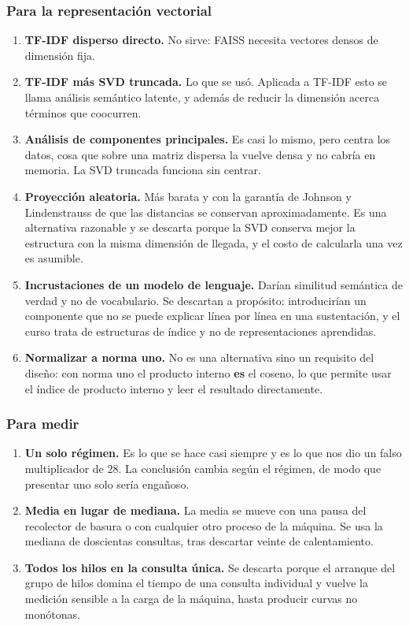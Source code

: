 \documentclass[11pt]{article}
\begin{document}
\subsubsection*{Para la representación vectorial}
\begin{enumerate}
  \item \textbf{TF-IDF disperso directo.} No sirve: FAISS necesita vectores densos de dimensión fija.
  \item \textbf{TF-IDF más SVD truncada.} Lo que se usó. Aplicada a TF-IDF esto se llama análisis semántico latente, y además de reducir la dimensión acerca términos que coocurren.
  \item \textbf{Análisis de componentes principales.} Es casi lo mismo, pero centra los datos, cosa que sobre una matriz dispersa la vuelve densa y no cabría en memoria. La SVD truncada funciona sin centrar.
  \item \textbf{Proyección aleatoria.} Más barata y con la garantía de Johnson y Lindenstrauss de que las distancias se conservan aproximadamente. Es una alternativa razonable y se descarta porque la SVD conserva mejor la estructura con la misma dimensión de llegada, y el costo de calcularla una vez es asumible.
  \item \textbf{Incrustaciones de un modelo de lenguaje.} Darían similitud semántica de verdad y no de vocabulario. Se descartan a propósito: introducirían un componente que no se puede explicar línea por línea en una sustentación, y el curso trata de estructuras de índice y no de representaciones aprendidas.
  \item \textbf{Normalizar a norma uno.} No es una alternativa sino un requisito del diseño: con norma uno el producto interno \textbf{es} el coseno, lo que permite usar el índice de producto interno y leer el resultado directamente.
\end{enumerate}
\subsubsection*{Para medir}
\begin{enumerate}
  \item \textbf{Un solo régimen.} Es lo que se hace casi siempre y es lo que nos dio un falso multiplicador de 28. La conclusión cambia según el régimen, de modo que presentar uno solo sería engañoso.
  \item \textbf{Media en lugar de mediana.} La media se mueve con una pausa del recolector de basura o con cualquier otro proceso de la máquina. Se usa la mediana de doscientas consultas, tras descartar veinte de calentamiento.
  \item \textbf{Todos los hilos en la consulta única.} Se descarta porque el arranque del grupo de hilos domina el tiempo de una consulta individual y vuelve la medición sensible a la carga de la máquina, hasta producir curvas no monótonas.
\end{enumerate}
\end{document}

